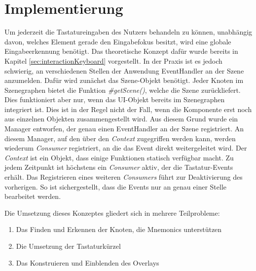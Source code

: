 \section{Implementierung} \label{sec:interactionImplementation}
Um jederzeit die Tastatureingaben des Nutzers behandeln zu können, unabhängig davon, welches Element gerade den Eingabefokus besitzt, wird eine globale Eingabeerkennung benötigt. Das theoretische Konzept dafür wurde bereits in Kapitel \ref{sec:interactionKeyboard} vorgestellt. In der Praxis ist es jedoch schwierig, an verschiedenen Stellen der Anwendung EventHandler an der Szene anzumelden. Dafür wird zunächst das Szene-Objekt benötigt. Jeder Knoten im Szenegraphen bietet die Funktion \textit{\#{}getScene()}, welche die Szene zurückliefert. Dies funktioniert aber nur, wenn das UI-Objekt bereits im Szenegraphen integriert ist. Dies ist in der Regel nicht der Fall, wenn die Komponente erst noch aus einzelnen Objekten zusammengestellt wird. Aus diesem Grund wurde ein Manager entworfen, der genau einen EventHandler an der Szene registriert. An diesem Manager, auf den über den \textit{Context} zugegriffen werden kann, werden wiederum \textit{Consumer} registriert, an die das Event direkt weitergeleitet wird. Der \textit{Context} ist ein Objekt, dass einige Funktionen statisch verfügbar macht. Zu jedem Zeitpunkt ist höchstens ein \textit{Consumer} aktiv, der die Tastatur-Events erhält. Das Registrieren eines weiteren \textit{Consumers} führt zur Deaktivierung des vorherigen. So ist sichergestellt, dass die Events nur an genau einer Stelle bearbeitet werden.\par
{}
Die Umsetzung dieses Konzeptes gliedert sich in mehrere Teilprobleme:
\begin{enumerate}
 \item Das Finden und Erkennen der Knoten, die Mnemonics unterstützen
 \item Die Umsetzung der Tastaturkürzel
 \item Das Konstruieren und Einblenden des Overlays
\end{enumerate}
